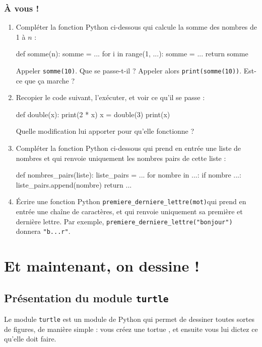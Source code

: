 \documentclass[12pt,a4paper, oneside]{article}
\theoremstyle{definition}
\begin{document}
   \subsubsection*{À vous !}
   \begin{enumerate}
      \item Compléter la fonction Python ci-dessous qui calcule la somme des nombres de 1 à $n$ :
         \begin{pyverbatim}
           def somme(n):
             somme = ...
             for i in range(1, ...):
               somme = ...
             return somme
         \end{pyverbatim}
      Appeler \texttt{somme(10)}.
      Que se passe-t-il ?
      Appeler alors \texttt{print(somme(10))}.
      Est-ce que ça marche ?
      \item Recopier le code suivant, l'exécuter, et voir ce qu'il se passe :
         \begin{pyverbatim}
            def double(x):
               print(2 * x)
            x = double(3)
            print(x)
         \end{pyverbatim}
      Quelle modification lui apporter pour qu'elle fonctionne ?
      \item Compléter la fonction Python ci-dessous qui prend en entrée une liste de nombres et qui renvoie uniquement les nombres pairs de cette liste :
         \begin{pyverbatim}
            def nombres_pairs(liste):
                liste_pairs = ...
                for nombre in ...:
                    if nombre ...:
                        liste_pairs.append(nombre)
                return ...
         \end{pyverbatim}
      \item Écrire une fonction Python \texttt{premiere\_derniere\_lettre(mot)}qui prend en entrée une chaîne de caractères, et qui renvoie uniquement sa première et dernière lettre.
      Par exemple, \texttt{premiere\_derniere\_lettre("bonjour")} donnera \texttt{"b...r"}.
   \end{enumerate}

\section{Et maintenant, on dessine !}\label{sec:et-maintenant-on-dessine-!}
   \subsection{Présentation du module \texttt{turtle}}\label{subsec:présentation-du-module-texttt-turtle}
      Le module \texttt{turtle} est un module de Python qui permet de dessiner toutes sortes de figures, de manière simple : vous créez une \og tortue \fg{}, et ensuite vous lui dictez ce qu'elle doit faire.
\end{document}
